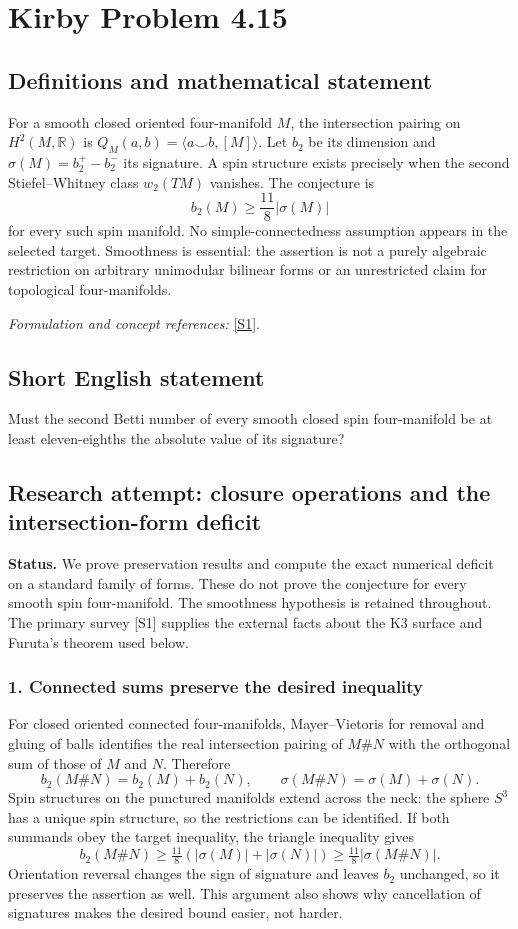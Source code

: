 \documentclass[11pt]{article}
\begin{document}
\section*{\texorpdfstring{Kirby Problem 4.15}{Kirby Problem 4.15}}\label{statement}
\subsection{Definitions and mathematical statement}
For a smooth closed oriented four-manifold $M$, the intersection pairing on
$H^2(M,{\mathbb{R}})$ is $Q_M(a,b)=\langle a\smile b,[M]\rangle$. Let $b_2$ be its dimension and $\sigma(M)=b_2^+-b_2^-$ its signature. A spin structure exists precisely when the second Stiefel--Whitney class $w_2(TM)$ vanishes. The conjecture is
\[
 b_2(M)\ge\frac{11}{8}|\sigma(M)|
\]
for every such spin manifold. No simple-connectedness assumption appears in the selected target. Smoothness is essential: the assertion is not a purely algebraic restriction on arbitrary unimodular bilinear forms or an unrestricted claim for topological four-manifolds.
\par\smallskip\textit{Formulation and concept references:} \href{https://web.stanford.edu/~cm5/4D.pdf}{[S1]}.

\subsection{Short English statement}
Must the second Betti number of every smooth closed spin four-manifold be at least eleven-eighths the absolute value of its signature?
\subsection{Research attempt: closure operations and the intersection-form deficit}
\textbf{Status.} We prove preservation results and compute the exact numerical deficit on a standard family of forms. These do not prove the conjecture for every smooth spin four-manifold. The smoothness hypothesis is retained throughout. The primary survey [S1] supplies the external facts about the K3 surface and Furuta's theorem used below.

\subsubsection{1. Connected sums preserve the desired inequality}
For closed oriented connected four-manifolds, Mayer--Vietoris for removal and gluing of balls identifies the real intersection pairing of $M\#N$ with the orthogonal sum of those of $M$ and $N$. Therefore
\[ b_2(M\#N)=b_2(M)+b_2(N),\qquad \sigma(M\#N)=\sigma(M)+\sigma(N).\]
Spin structures on the punctured manifolds extend across the neck: the sphere $S^3$ has a unique spin structure, so the restrictions can be identified. If both summands obey the target inequality, the triangle inequality gives
\[b_2(M\#N)\ge\tfrac{11}{8}(|\sigma(M)|+|\sigma(N)|)\ge\tfrac{11}{8}|\sigma(M\#N)|.\]
Orientation reversal changes the sign of signature and leaves $b_2$ unchanged, so it preserves the assertion as well. This argument also shows why cancellation of signatures makes the desired bound easier, not harder.
\end{document}
